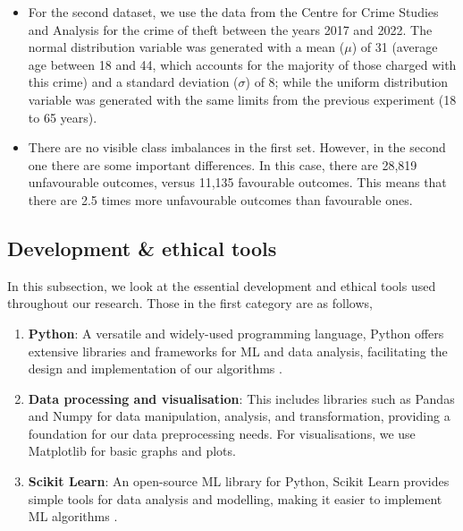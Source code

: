 \documentclass[fleqn,10pt]{wlscirep}
\begin{document}
\begin{itemize}
        \item For the second dataset, we use the data from the Centre for Crime Studies and Analysis \cite{PortalCEAD} for the crime of theft between the years 2017 and 2022. The normal distribution variable was generated with a mean ($\mu$) of 31 (average age between 18 and 44, which accounts for the majority of those charged with this crime) and a standard deviation ($\sigma$) of 8; while the uniform distribution variable was generated with the same limits from the previous experiment (18 to 65 years). 
        
        \item There are no visible class imbalances in the first set. However, in the second one there are some important differences. In this case, there are 28,819 unfavourable outcomes, versus 11,135 favourable outcomes. This means that there are 2.5 times more unfavourable outcomes than favourable ones.
        
    \end{itemize}

\subsection{Development \& ethical tools}

In this subsection, we look at the essential development and ethical tools used throughout our research. Those in the first category are as follows,

\begin{enumerate}
    \item \textbf{Python}: A versatile and widely-used programming language, Python offers extensive libraries and frameworks for ML and data analysis, facilitating the design and implementation of our algorithms \cite{10.5555/1593511}.
    
    \item \textbf{Data processing and visualisation}: This includes libraries such as Pandas \cite{reback2020pandas} and Numpy \cite{harris2020array} for data manipulation, analysis, and transformation, providing a foundation for our data preprocessing needs. For visualisations, we use Matplotlib \cite{Hunter:2007} for basic graphs and plots.

    \item \textbf{Scikit Learn}: An open-source ML library for Python, Scikit Learn provides simple tools for data analysis and modelling, making it easier to implement ML algorithms \cite{scikit-learn}.
\end{enumerate}
\end{document}
